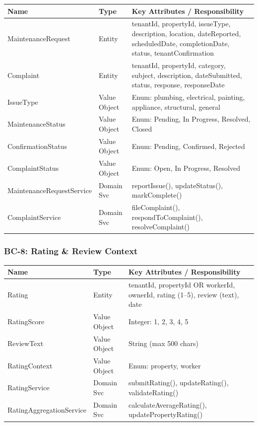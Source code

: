 \documentclass[12pt,a4paper]{article}
\begin{document}
\begin{center}
\begin{tabular}{@{}p{3.5cm}p{2cm}p{8.5cm}@{}}
\toprule
\textbf{Name} & \textbf{Type} & \textbf{Key Attributes / Responsibility} \\
\midrule
MaintenanceRequest & Entity & tenantId, propertyId, issueType, description, location, dateReported, scheduledDate, completionDate, status, tenantConfirmation \\
Complaint & Entity & tenantId, propertyId, category, subject, description, dateSubmitted, status, response, responseDate \\
IssueType & Value Object & Enum: plumbing, electrical, painting, appliance, structural, general \\
MaintenanceStatus & Value Object & Enum: Pending, In Progress, Resolved, Closed \\
ConfirmationStatus & Value Object & Enum: Pending, Confirmed, Rejected \\
ComplaintStatus & Value Object & Enum: Open, In Progress, Resolved \\
MaintenanceRequestService & Domain Svc & reportIssue(), updateStatus(), markComplete() \\
ComplaintService & Domain Svc & fileComplaint(), respondToComplaint(), resolveComplaint() \\
\bottomrule
\end{tabular}
\end{center}

\subsubsection{BC-8: Rating \& Review Context}

\begin{center}
\begin{tabular}{@{}p{3.5cm}p{2cm}p{8.5cm}@{}}
\toprule
\textbf{Name} & \textbf{Type} & \textbf{Key Attributes / Responsibility} \\
\midrule
Rating & Entity & tenantId, propertyId OR workerId, ownerId, rating (1--5), review (text), date \\
RatingScore & Value Object & Integer: 1, 2, 3, 4, 5 \\
ReviewText & Value Object & String (max 500 chars) \\
RatingContext & Value Object & Enum: property, worker \\
RatingService & Domain Svc & submitRating(), updateRating(), validateRating() \\
RatingAggregationService & Domain Svc & calculateAverageRating(), updatePropertyRating() \\
\bottomrule
\end{tabular}
\end{center}
\end{document}
